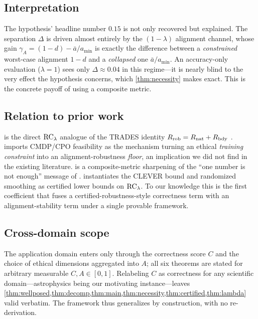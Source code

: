 \subsection{Interpretation}
The hypothesis' headline number $0.15$ is not only recovered but explained. The
separation $\Delta$ is driven almost entirely by the $(1-\lambda)$ alignment
channel, whose gain $\gamma_A=(1-d)-\bar a/a_{\min}$ is exactly the difference
between a \emph{constrained} worst-case alignment $1-d$ and a \emph{collapsed} one
$\bar a/a_{\min}$. An accuracy-only evaluation ($\lambda=1$) sees only
$\Delta\approx0.04$ in this regime---it is nearly blind to the very effect the
hypothesis concerns, which \cref{thm:necessity} makes exact. This is the concrete
payoff of using a composite metric.

\subsection{Relation to prior work}
 is the direct $\mathrm{RC}_\lambda$ analogue of the TRADES identity
$R_{\mathrm{rob}}=R_{\mathrm{nat}}+R_\mathrm{bdy}$ \cite{Zhang2019}.  imports CMDP/CPO
feasibility \cite{Achiam2017} as the mechanism turning an ethical
\emph{training constraint} into an alignment-robustness \emph{floor}, an implication
we did not find in the existing literature.  is a
composite-metric sharpening of the ``one number is not enough'' message of
\cite{Tsipras2018}.  instantiates the CLEVER bound
\cite{Weng2018} and randomized smoothing \cite{Cohen2019} as certified lower bounds
on $\mathrm{RC}_\lambda$. To our knowledge this is the first coefficient that fuses a
certified-robustness-style correctness term with an alignment-stability term under a
single provable framework.

\subsection{Cross-domain scope}
The application domain enters only through the correctness score $C$ and the choice
of ethical dimensions aggregated into $A$; all six theorems are stated for arbitrary
measurable $C,A\in[0,1]$. Relabeling $C$ as correctness for any scientific
domain---astrophysics being our motivating instance---leaves
\cref{thm:wellposed,thm:decomp,thm:main,thm:necessity,thm:certified,thm:lambda}
valid verbatim. The framework thus generalizes by construction, with no
re-derivation.

